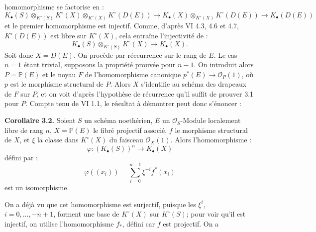 homomorphisme se factorise en :
\[
K_\bullet(S)\otimes_{K^\circ(S)}K^\circ(X)\otimes_{K^\circ(X)}K^\circ(D(E))
\longrightarrow K_\bullet(X)\otimes_{K^\circ(X)}K^\circ(D(E))
\longrightarrow K_\bullet(D(E))
\]
et le premier homomorphisme est injectif. Comme, d'après VI 4.3, 4.6 et 4.7, $K^\circ(D(E))$ est libre sur $K^\circ(X)$, cela entraîne l'injectivité de :
\[
K_\bullet(S)\otimes_{K^\circ(S)}K^\circ(X)\to K_\bullet(X).
\]
Soit donc $X=D(E)$. On procède par réccurrence sur le rang de $E$. Le cas $n=1$ étant trivial, supposons la propriété prouvée pour $n-1$. On introduit alors $P=\mathbb P(E)$ et le noyau $F$ de l'homomorphisme canonique $p^*(E)\to \mathcal O_P(1)$, où $p$ est le morphisme structural de $P$. Alors $X$ s'identifie au schéma des drapeaux de $F$ sur $P$, et on voit d'après l'hypothèse de récurrence qu'il suffit de prouver 3.1 pour $P$. Compte tenu de VI 1.1, le résultat à démontrer peut donc s'énoncer :

\textbf{Corollaire 3.2.} Soient $S$ un schéma noethérien, $E$ un $\mathcal O_S$-Module localement libre de rang $n$, $X=\mathbb P(E)$ le fibré projectif associé, $f$ le morphisme structural de $X$, et $\xi$ la classe dans $K^\circ(X)$ du faisceau $\mathcal O_X(1)$. Alors l'homomorphisme :
\[
\varphi:(K_\bullet(S))^n\longrightarrow K_\bullet(X)
\]
défini par :
\[
\varphi((x_i))=\sum_{i=0}^{n-1}\xi^{-i}f^*(x_i)
\]
est un isomorphisme.

On a déjà vu que cet homomorphisme est surjectif, puisque les $\xi^i$, $i=0,\ldots,-n+1$, forment une base de $K^\circ(X)$ sur $K^\circ(S)$; pour voir qu'il est injectif, on utilise l'homomorphisme $f_*$, défini car $f$ est projectif. On a
